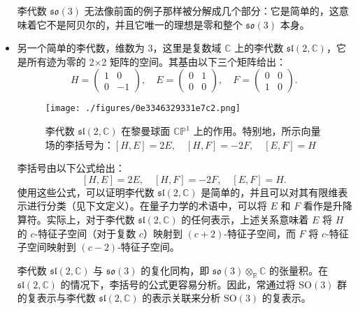 \begin{itemize}
李代数 \( \mathfrak{so}(3) \) 无法像前面的例子那样被分解成几个部分：它是简单的，这意味着它不是阿贝尔的，并且它唯一的理想是零和整个 \( \mathfrak{so}(3) \) 本身。
\item 另一个简单的李代数，维数为 3，这里是复数域 \( \mathbb{C} \) 上的李代数 \( \mathfrak{sl}(2, \mathbb{C}) \)，它是所有迹为零的 2×2 矩阵的空间。其基由以下三个矩阵给出：
\[
H = \left( \begin{array}{cc} 1 & 0 \\ 0 & -1 \end{array} \right), \quad E = \left( \begin{array}{cc} 0 & 1 \\ 0 & 0 \end{array} \right), \quad F = \left( \begin{array}{cc} 0 & 0 \\ 1 & 0 \end{array} \right).~
\]
\begin{figure}[ht]
\centering
\texttt{[image: ./figures/0e3346329331e7c2.png]}
\caption{李代数 \( \mathfrak{sl}(2, \mathbb{C}) \) 在黎曼球面 \( \mathbb{CP}^1 \) 上的作用。特别地，所示向量场的李括号为：\([H, E] = 2E, \quad [H, F] = -2F, \quad [E, F] = H\)} \label{fig_LieDS_1}
\end{figure}
李括号由以下公式给出：
\[
[H, E] = 2E, \quad [H, F] = -2F, \quad [E, F] = H.~
\]
使用这些公式，可以证明李代数 \( \mathfrak{sl}(2, \mathbb{C}) \) 是简单的，并且可以对其有限维表示进行分类（见下文定义）。在量子力学的术语中，可以将 \( E \) 和 \( F \) 看作是升降算符。实际上，对于李代数 \( \mathfrak{sl}(2, \mathbb{C}) \) 的任何表示，上述关系意味着 \( E \) 将 \( H \) 的 \( c \)-特征子空间（对于复数 \( c \)）映射到 \( (c+2) \)-特征子空间，而 \( F \) 将 \( c \)-特征子空间映射到 \( (c-2) \)-特征子空间。

李代数 \( \mathfrak{sl}(2, \mathbb{C}) \) 与 \( \mathfrak{so}(3) \) 的复化同构，即 \( \mathfrak{so}(3) \otimes_{\mathbb{R}} \mathbb{C} \) 的张量积。在 \( \mathfrak{sl}(2, \mathbb{C}) \) 的情况下，李括号的公式更容易分析。因此，常通过将 \( \mathrm{SO}(3) \) 群的复表示与李代数 \( \mathfrak{sl}(2, \mathbb{C}) \) 的表示关联来分析 \( \mathrm{SO}(3) \) 的复表示。
\end{itemize}
